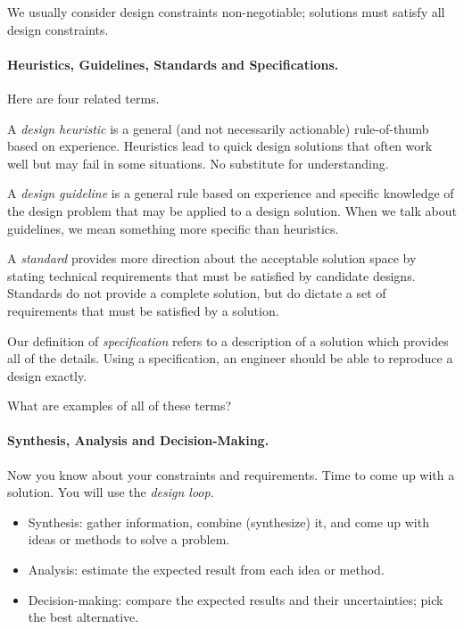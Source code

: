 We usually consider design constraints non-negotiable; solutions must
satisfy all design constraints.

\paragraph{Heuristics, Guidelines, Standards and Specifications.} 
Here are four related terms.

A \emph{design heuristic} is a general (and not necessarily
actionable) rule-of-thumb based on experience.  Heuristics lead to
quick design solutions that often work well but may fail in some
situations. No substitute for understanding.

A \emph{design guideline} is a general rule based on experience and
specific knowledge of the design problem that may be applied to a design
solution. When we talk about guidelines, we mean something more specific
than heuristics.

A \emph{standard} provides more direction about the acceptable
solution space by stating technical requirements that must be satisfied
by candidate designs. Standards do not provide a complete solution, but 
do dictate a set of requirements that must be satisfied by a solution.

Our definition of \emph{specification} refers to a description of a solution
which provides all of the details. Using a specification, an engineer
should be able to reproduce a design exactly.

{\sf What are examples of all of these terms?} \\[6em]

\paragraph{Synthesis, Analysis and Decision-Making.} Now you know about
your constraints and requirements. Time to come up with a solution.
You will use the \emph{design loop}.

\begin{itemize}
\item Synthesis: gather information, combine (synthesize) it, and come up
with ideas or methods to solve a problem.
\item Analysis: estimate the expected result from each idea or method.
\item Decision-making: compare the expected results and their uncertainties; pick the best alternative.
\end{itemize}

